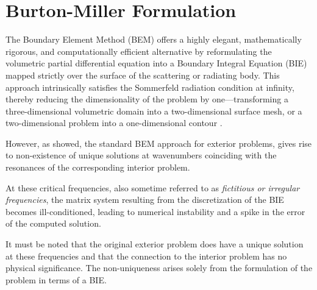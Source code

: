 \section{Burton-Miller Formulation}\label{sec:burton-miller}

The Boundary Element Method (BEM) offers a highly elegant, mathematically rigorous, and computationally efficient alternative by reformulating the volumetric partial differential equation into a Boundary Integral Equation (BIE) mapped strictly over the surface of the scattering or radiating body. This approach intrinsically satisfies the Sommerfeld radiation condition at infinity, thereby reducing the dimensionality of the problem by one—transforming a three-dimensional volumetric domain into a two-dimensional surface mesh, or a two-dimensional problem into a one-dimensional contour \cite{latex, wu2000boundary, marburg2002boundary,kirkupboundaryelementmethod1998}.

However, as \cite{burtonapplicationintegralequation1971} showed, the standard \ac{BEM} approach for exterior problems, gives rise to non-existence of unique solutions at wavenumbers coinciding with the resonances of the corresponding interior problem.

At these critical frequencies, also sometime referred to as \textit{fictitious or irregular frequencies}, the matrix system resulting from the discretization of the BIE  becomes ill-conditioned, leading to numerical instability and a spike in the error of the computed solution. 

It must be noted that the original exterior problem does have a unique solution at these frequencies and that the connection to the interior problem has no physical significance. The non-uniqueness arises solely from the formulation of the problem in terms of a \ac{BIE}.\cite{burtonapplicationintegralequation1971}
